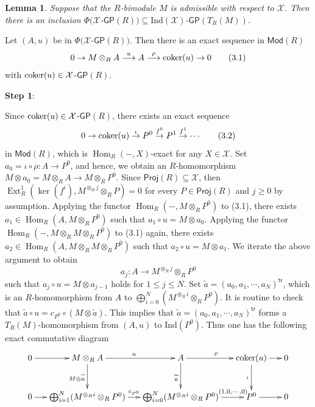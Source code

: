 \documentclass[10pt,twoside]{amsart}
\theoremstyle{bfupright head,slanted body}
\theoremstyle{bfupright head,upright body}
\theoremstyle{fixed bf head,slanted body}
\newtheorem{lem}[res]{Lemma}            \newtheorem*{lem*}{Lemma}
\theoremstyle{fixed bf head,upright body}
\theoremstyle{numbered paragraph}
\newenvironment{prf*}[1][Proof]{%
  \begin{proof}[\bf #1]
    \setcounter{equation}{0}
    \renewcommand{\theequation}{\arabic{equation}}}
  {\end{proof}
  }
\numberwithin{equation}{res}
\newcommand{\GP}{\mathsf{GP}}
\newcommand{\tr}{\mathsf{tr}}
\newcommand{\Proj}{\mathsf{Proj}}
\newcommand{\Mod}{\mathsf{Mod}}
\newcommand{\Ind}{\mathrm{Ind}}
\newcommand{\cok}{\mbox{\rm coker}}
\newcommand{\Hom}{\operatorname{Hom}}
\newcommand{\Ext}{\operatorname{Ext}}
\begin{document}
\begin{lem} \label{Phi in GPTRM}
Suppose that the $R$-bimodule $M$ is admissible with respect to $\mathcal{X}$.
Then there is an inclusion $\Phi(\mathcal{X}$-$\GP(R)) \subseteq \Ind(\mathcal{X})$-$\GP(T_R(M))$.
\end{lem}

\begin{prf*}
Let $(A,u)$ be in $\Phi(\mathcal{X}$-$\GP(R))$.
Then there is an exact sequence in $\Mod(R)$
$$ 0 \to M\otimes_RA \overset{u}\longrightarrow A
\overset{\rho}\longrightarrow \cok(u) \to 0 \qquad(3.1)$$
with $\cok(u) \in \mathcal{X}$-$\GP(R)$.

\textbf{Step 1}:

Since $\cok(u) \in \mathcal{X}$-$\GP(R)$,
there exists an exact sequence
$$ 0\to\cok(u)\overset{\iota}\to P^{0} \overset{f^{0}}\to P^{1} \overset{f^{1}}\to \cdots \qquad(3.2)$$
in $\Mod(R)$, which is $\Hom_{R}(-, X)$-exact for any $X\in \mathcal{X}$.
Set $a_0= \iota \circ \rho : A \to P^{0}$, and hence,
we obtain an $R$-homomorphism
$M\otimes a_0= M\otimes_RA \to M\otimes_RP^{0}$.
Since $\Proj(R)\subseteq\mathcal{X}$,
then $\Ext_R^1(\ker(f^{i}),M^{\otimes_Rj}\otimes_RP)=0$ for every $P\in\Proj(R)$ and $j\geqslant 0$ by assumption.
Applying the functor $\Hom_R(-,M\otimes_RP^{0})$ to (3.1),
there exists $a_1\in \Hom_{R}(A, M\otimes_RP^{0})$ such that
$a_1 \circ u= M\otimes a_0$.
Applying the functor $\Hom_R(-,M\otimes_RM\otimes_RP^{0})$ to (3.1) again,
there exists $a_2\in \Hom_{R}(A, M\otimes_RM\otimes_RP^{0})$ such that
$a_2 \circ u= M\otimes a_1$.
We iterate the above argument to obtain
$$a_j: A \to M^{\otimes_Rj}\otimes_R P^{0}$$
such that $a_j \circ u= M\otimes a_{j-1}$ holds for $1 \leqslant j \leqslant N$.
Set $\widetilde{a}=(a_0, a_1, \cdots , a_N)^\tr$,
which is an $R$-homomorphism from
$A$ to $\bigoplus_{i=0}^N(M^{\otimes_Ri}\otimes_RP^{0})$.
It is routine to check that $\widetilde{a} \circ u = c_{P^{0}} \circ (M\otimes \widetilde{a})$.
This implies that $\widetilde{a}=(a_0, a_1, \cdots , a_N)^\tr$
forms a $T_R(M)$-homomorphism from $(A, u)$ to $\Ind(P^{0})$.
Thus one has the following exact commutative diagram
\begin{equation*}
\xymatrix@C=0.5cm@R=1cm{
  0 \ar[r] & M\otimes_RA \ar[d]_{M\otimes \widetilde{a}}\ar[r]^{u} & A \ar[d]_{\widetilde{a}}\ar[r]^{\rho} & \cok(u) \ar[d]_{\iota}\ar[r] & 0  \\
  0 \ar[r] & \bigoplus_{i=1}^N(M^{\otimes_Ri}\otimes_RP^{0}) \ar[r]^{c_{P^{0}}} & \bigoplus_{i=0}^N(M^{\otimes_Ri}\otimes_RP^{0}) \ar[r]^{\qquad \qquad (1,0,\cdots,0)} & P^{0} \ar[r] & 0}

\end{equation*}
\end{prf*}
\end{document}
